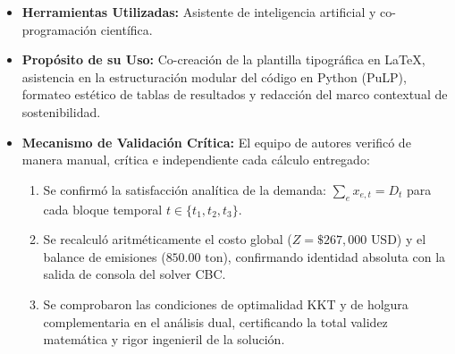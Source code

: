 \documentclass[11pt,a4paper]{article}
\begin{document}
\vspace{0.8cm}
\begin{tcolorbox}[colback=lightgray, colframe=primary, arc=3mm, title=\textbf{DECLARACIÓN DE USO ÉTICO DE IA GENERATIVA}]
\begin{itemize}
    \item \textbf{Herramientas Utilizadas:} Asistente de inteligencia artificial y co-programación científica.
    \item \textbf{Propósito de su Uso:} Co-creación de la plantilla tipográfica en \LaTeX, asistencia en la estructuración modular del código en Python (PuLP), formateo estético de tablas de resultados y redacción del marco contextual de sostenibilidad.
    \item \textbf{Mecanismo de Validación Crítica:}  
    El equipo de autores verificó de manera manual, crítica e independiente cada cálculo entregado:
    \begin{enumerate}
        \item Se confirmó la satisfacción analítica de la demanda: $\sum_e x_{e,t} = D_t$ para cada bloque temporal $t \in \{t_1, t_2, t_3\}$.
        \item Se recalculó aritméticamente el costo global ($Z = \$267,000 \text{ USD}$) y el balance de emisiones ($850.00 \text{ ton}$), confirmando identidad absoluta con la salida de consola del solver CBC.
        \item Se comprobaron las condiciones de optimalidad KKT y de holgura complementaria en el análisis dual, certificando la total validez matemática y rigor ingenieril de la solución.
    \end{enumerate}
\end{itemize}
\end{tcolorbox}
\end{document}
